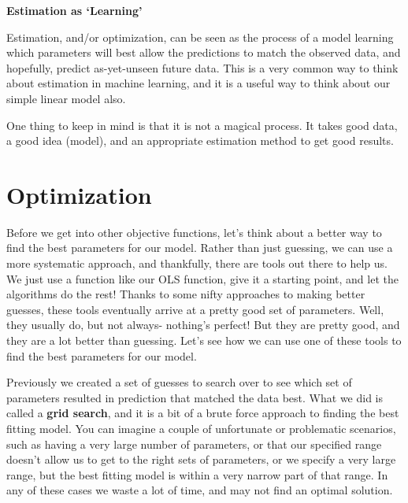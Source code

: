 \documentclass[
  letterpaper,
]{krantz}
\begin{document}
\begin{tcolorbox}[enhanced jigsaw, toprule=.15mm, arc=.35mm, rightrule=.15mm, bottomrule=.15mm, leftrule=.75mm, breakable, opacityback=0, colback=white, left=2mm]

\textbf{Estimation as `Learning'}\vspace{2mm}

Estimation, and/or optimization, can be seen as the process of a model
learning which parameters will best allow the predictions to match the
observed data, and hopefully, predict as-yet-unseen future data. This is
a very common way to think about estimation in machine learning, and it
is a useful way to think about our simple linear model also.

One thing to keep in mind is that it is not a magical process. It takes
good data, a good idea (model), and an appropriate estimation method to
get good results.

\end{tcolorbox}

\section{Optimization}\label{sec-estim-opt}

Before we get into other objective functions, let's think about a better
way to find the best parameters for our model. Rather than just
guessing, we can use a more systematic approach, and thankfully, there
are tools out there to help us. We just use a function like our OLS
function, give it a starting point, and let the algorithms do the rest!
Thanks to some nifty approaches to making better guesses, these tools
eventually arrive at a pretty good set of parameters. Well, they usually
do, but not always- nothing's perfect! But they are pretty good, and
they are a lot better than guessing. Let's see how we can use one of
these tools to find the best parameters for our model.

Previously we created a set of guesses to search over to see which set
of parameters resulted in prediction that matched the data best. What we
did is called a \textbf{grid search}, and it is a bit of a brute force
approach to finding the best fitting model. You can imagine a couple of
unfortunate or problematic scenarios, such as having a very large number
of parameters, or that our specified range doesn't allow us to get to
the right sets of parameters, or we specify a very large range, but the
best fitting model is within a very narrow part of that range. In any of
these cases we waste a lot of time, and may not find an optimal
solution.
\end{document}

